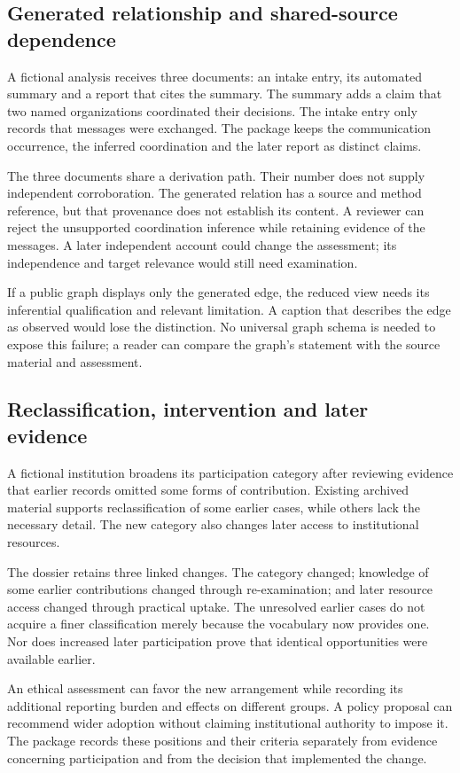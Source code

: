 \documentclass[11pt,a4paper]{article}
\begin{document}
\subsection{Generated relationship and shared-source dependence}
A fictional analysis receives three documents: an intake entry, its automated summary and a report that cites the summary. The summary adds a claim that two named organizations coordinated their decisions. The intake entry only records that messages were exchanged. The package keeps the communication occurrence, the inferred coordination and the later report as distinct claims.

The three documents share a derivation path. Their number does not supply independent corroboration. The generated relation has a source and method reference, but that provenance does not establish its content. A reviewer can reject the unsupported coordination inference while retaining evidence of the messages. A later independent account could change the assessment; its independence and target relevance would still need examination.

If a public graph displays only the generated edge, the reduced view needs its inferential qualification and relevant limitation. A caption that describes the edge as observed would lose the distinction. No universal graph schema is needed to expose this failure; a reader can compare the graph's statement with the source material and assessment.

\subsection{Reclassification, intervention and later evidence}
A fictional institution broadens its participation category after reviewing evidence that earlier records omitted some forms of contribution. Existing archived material supports reclassification of some earlier cases, while others lack the necessary detail. The new category also changes later access to institutional resources.

The dossier retains three linked changes. The category changed; knowledge of some earlier contributions changed through re-examination; and later resource access changed through practical uptake. The unresolved earlier cases do not acquire a finer classification merely because the vocabulary now provides one. Nor does increased later participation prove that identical opportunities were available earlier.

An ethical assessment can favor the new arrangement while recording its additional reporting burden and effects on different groups. A policy proposal can recommend wider adoption without claiming institutional authority to impose it. The package records these positions and their criteria separately from evidence concerning participation and from the decision that implemented the change.
\end{document}
